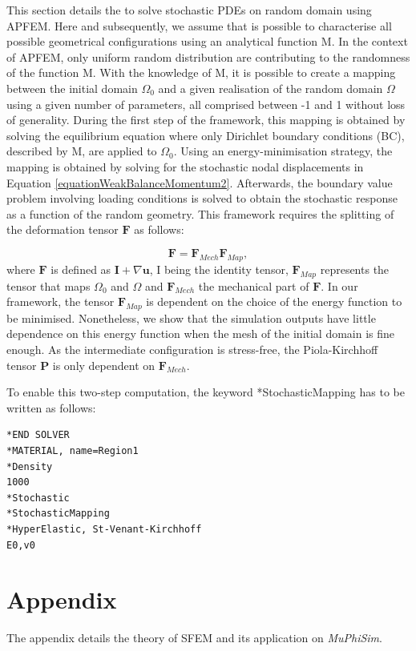 \documentclass[oneside,11pt,times]{book}
\begin{document}
This section details the to solve stochastic PDEs on random domain using APFEM. Here and subsequently, we assume that is possible to characterise all possible geometrical configurations using an analytical function M. In the context of APFEM, only uniform random distribution are contributing to the randomness of the function M. With the knowledge of M, it is possible to create a mapping between the initial domain $\Omega_0$ and a given realisation of the random domain $\Omega$ using a given number of parameters, all comprised between -1 and 1 without loss of generality. During the first step of the framework, this mapping is obtained by solving the equilibrium equation where only Dirichlet boundary conditions (BC), described by M, are applied to $\Omega_0$. Using an energy-minimisation strategy, the mapping is obtained by solving for the stochastic nodal displacements in Equation \eqref{equationWeakBalanceMomentum2}. Afterwards, the boundary value problem involving loading conditions is solved to obtain the stochastic response as a function of the random geometry. This framework requires the splitting of the deformation tensor $\bm{F}$ as follows:

\begin{equation} \label{F-Splitted}
  \bm{F} = \bm{F}_{Mech}\bm{F}_{Map},
\end{equation}
where $\bm{F}$ is defined as $\bm{I} + \nabla \bm{u}$, I being the identity tensor, $\bm{F}_{Map}$ represents the tensor that maps $\Omega_0$ and $\Omega$ and $\bm{F}_{Mech}$ the mechanical part of $\bm{F}$. In our framework, the tensor $\bm{F}_{Map}$ is dependent on the choice of the energy function to be minimised. Nonetheless, we show that the simulation outputs have little dependence on this energy function when the mesh of the initial domain is fine enough. As the intermediate configuration is stress-free, the Piola-Kirchhoff tensor $\boldsymbol{P}$ is only dependent on $\bm{F}_{Mech}$.  

To enable this two-step computation, the keyword *StochasticMapping has to be written as follows:
\begin{lstlisting}
*END SOLVER
*MATERIAL, name=Region1
*Density
1000
*Stochastic
*StochasticMapping
*HyperElastic, St-Venant-Kirchhoff
E0,v0

 \end{lstlisting}


\section{Appendix}
The appendix details the theory of SFEM and its application on \textit{MuPhiSim}.
\end{document}
